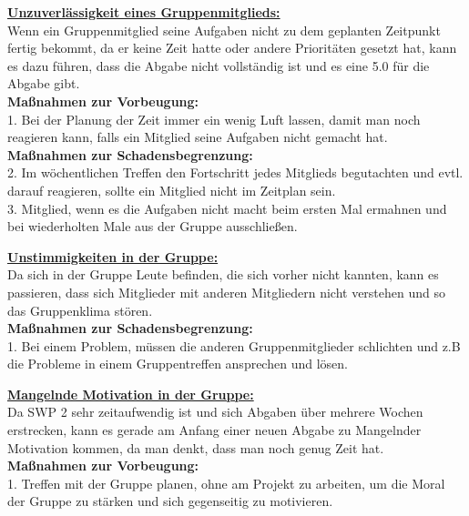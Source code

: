 \documentclass[fontsize=12pt,paper=a4,twoside]{scrartcl}
\begin{document}
\bigskip

\textbf{\underline{Unzuverlässigkeit eines Gruppenmitglieds:}}\\
Wenn ein Gruppenmitglied seine Aufgaben nicht zu dem geplanten Zeitpunkt fertig bekommt, da er keine Zeit hatte oder andere Prioritäten gesetzt hat, kann es dazu führen, dass die Abgabe nicht vollständig ist und es eine 5.0 für die Abgabe gibt.\\
\textbf{Maßnahmen zur Vorbeugung:}\\
1. Bei der Planung der Zeit immer ein wenig Luft lassen, damit man noch reagieren kann, falls ein Mitglied seine Aufgaben nicht gemacht hat.\\
\textbf{Maßnahmen zur Schadensbegrenzung:}\\
2. Im wöchentlichen Treffen den Fortschritt jedes Mitglieds begutachten und evtl. darauf reagieren, sollte ein Mitglied nicht im Zeitplan sein.\\
3. Mitglied, wenn es die Aufgaben nicht macht beim ersten Mal ermahnen und bei wiederholten Male aus der Gruppe  ausschließen.\\

\bigskip

\textbf{\underline{Unstimmigkeiten in der Gruppe:}}\\
Da sich in der Gruppe Leute befinden, die sich vorher nicht kannten, kann es passieren, dass sich Mitglieder mit anderen Mitgliedern nicht verstehen und so das Gruppenklima stören.\\
\textbf{Maßnahmen zur Schadensbegrenzung:}\\
1. Bei einem Problem, müssen die anderen Gruppenmitglieder schlichten und z.B die Probleme in einem Gruppentreffen ansprechen und lösen.\\

\bigskip 

\textbf{\underline{Mangelnde Motivation in der Gruppe:}}\\
Da SWP 2 sehr zeitaufwendig ist und sich Abgaben über mehrere Wochen erstrecken, kann es gerade am Anfang einer neuen Abgabe zu Mangelnder Motivation kommen, da man denkt, dass man noch genug Zeit hat.\\
\textbf{Maßnahmen zur Vorbeugung:}\\
1. Treffen mit der Gruppe planen, ohne am Projekt zu arbeiten, um die Moral der Gruppe zu stärken und sich gegenseitig zu motivieren.\\

\bigskip
\end{document}
